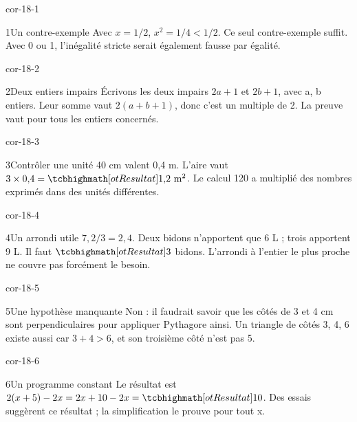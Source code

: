 \clearpage\pagestyle{otMain}\fontsize{11}{15}\selectfont{}
\begin{blocLivre}{cor-18-1}\begin{corrige}{1}{Un contre-exemple}
Avec $x=1/2$, $x^2=1/4<1/2$. Ce seul contre-exemple suffit. Avec 0 ou 1, l’inégalité stricte serait également fausse par égalité.
\end{corrige}\end{blocLivre}
\begin{blocLivre}{cor-18-2}\begin{corrige}{2}{Deux entiers impairs}
Écrivons les deux impairs $2a+1$ et $2b+1$, avec a, b entiers. Leur somme vaut $2(a+b+1)$, donc c’est un multiple de 2. La preuve vaut pour tous les entiers concernés.
\end{corrige}\end{blocLivre}
\begin{blocLivre}{cor-18-3}\begin{corrige}{3}{Contrôler une unité}
40 cm valent 0,4 m. L’aire vaut $3\times0{,}4=\res{1{,}2\text{ m}^2}$. Le calcul 120 a multiplié des nombres exprimés dans des unités différentes.
\end{corrige}\end{blocLivre}
\begin{blocLivre}{cor-18-4}\begin{corrige}{4}{Un arrondi utile}
$7{,}2/3=2{,}4$. Deux bidons n’apportent que 6 L ; trois apportent 9 L. Il faut $\res3$ bidons. L’arrondi à l’entier le plus proche ne couvre pas forcément le besoin.
\end{corrige}\end{blocLivre}
\begin{blocLivre}{cor-18-5}\begin{corrige}{5}{Une hypothèse manquante}
Non : il faudrait savoir que les côtés de 3 et 4 cm sont perpendiculaires pour appliquer Pythagore ainsi. Un triangle de côtés 3, 4, 6 existe aussi car $3+4>6$, et son troisième côté n’est pas 5.
\end{corrige}\end{blocLivre}
\begin{blocLivre}{cor-18-6}\begin{corrige}{6}{Un programme constant}
Le résultat est $2(x+5)-2x=2x+10-2x=\res{10}$. Des essais suggèrent ce résultat ; la simplification le prouve pour tout x.
\end{corrige}\end{blocLivre}

